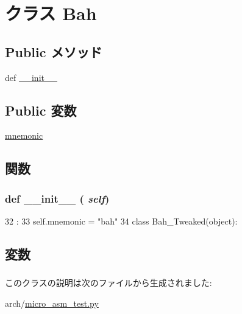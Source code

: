 \hypertarget{classmicro__asm__test_1_1Bah}{
\section{クラス Bah}
\label{classmicro__asm__test_1_1Bah}
}
\subsection*{Public メソッド}
\begin{DoxyCompactItemize}
\item 
def \hyperlink{classmicro__asm__test_1_1Bah_ac775ee34451fdfa742b318538164070e}{\_\-\_\-init\_\-\_\-}
\end{DoxyCompactItemize}
\subsection*{Public 変数}
\begin{DoxyCompactItemize}
\item 
\hyperlink{classmicro__asm__test_1_1Bah_aaf1ad8da0f374cbd19a0a177d5280477}{mnemonic}
\end{DoxyCompactItemize}


\subsection{関数}
\hypertarget{classmicro__asm__test_1_1Bah_ac775ee34451fdfa742b318538164070e}{
\subsubsection[{\_\-\_\-init\_\-\_\-}]{\setlength{\rightskip}{0pt plus 5cm}def \_\-\_\-init\_\-\_\- ( {\em self})}}
\label{classmicro__asm__test_1_1Bah_ac775ee34451fdfa742b318538164070e}



\begin{DoxyCode}
32                       :
33         self.mnemonic = "bah"
34 
class Bah_Tweaked(object):
\end{DoxyCode}


\subsection{変数}
\hypertarget{classmicro__asm__test_1_1Bah_aaf1ad8da0f374cbd19a0a177d5280477}{
\subsubsection[{mnemonic}]{}}
\label{classmicro__asm__test_1_1Bah_aaf1ad8da0f374cbd19a0a177d5280477}


このクラスの説明は次のファイルから生成されました:\begin{DoxyCompactItemize}
\item 
arch/\hyperlink{micro__asm__test_8py}{micro\_\-asm\_\-test.py}\end{DoxyCompactItemize}
